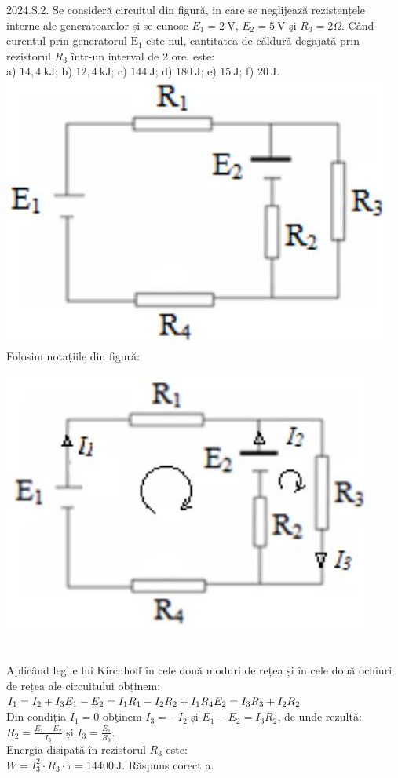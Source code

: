 2024.S.2. Se consideră circuitul din figură, in care se neglijează rezistențele interne ale generatoarelor și se cunosc $E_{1}=2 \mathrm{~V}$, $E_{2}=5 \mathrm{~V}$ şi $R_{3}=2 \Omega$. Când curentul prin generatorul $\mathrm{E}_{1}$ este nul, cantitatea de căldură degajată prin rezistorul $R_{3}$ într-un interval de 2 ore, este:\\ a) $14,4 \mathrm{~kJ}$; b) $12,4 \mathrm{~kJ}$; c) $144 \mathrm{~J}$; d) $180 \mathrm{~J}$; e) $15 \mathrm{~J}$; f) $20 \mathrm{~J}$.\\ \includegraphics[width=0.4\linewidth]{images/2025_08_27_3bb07d46e3cd56c9410dg-1}\\ Folosim notațiile din figură:\\ \begin{center} \includegraphics[width=0.4\linewidth]{images/2025_08_27_5ca5e43b13015248f3a3g-1} \end{center}\\ Aplicând legile lui Kirchhoff în cele două moduri de rețea și în cele două ochiuri de rețea ale circuitului obținem:\\ $I_{1}=I_{2}+I_{3}\\ E_{1}-E_{2}=I_{1} R_{1}-I_{2} R_{2}+I_{1} R_{4}\\ E_{2}=I_{3} R_{3}+I_{2} R_{2}$\\ Din condiția $I_{1}=0$ obţinem $I_{3}=-I_{2}$ și $E_{1}-E_{2}=I_{3} R_{2}$, de unde rezultă:\\ $R_{2}=\frac{E_{1}-E_{2}}{I_{3}}$ și $I_{3}=\frac{E_{1}}{R_{3}}$.\\ Energia disipată în rezistorul $R_{3}$ este:\\ $W=I_{3}^{2} \cdot R_{3} \cdot \tau=14400 \mathrm{~J}$. Răspuns corect a.\\


